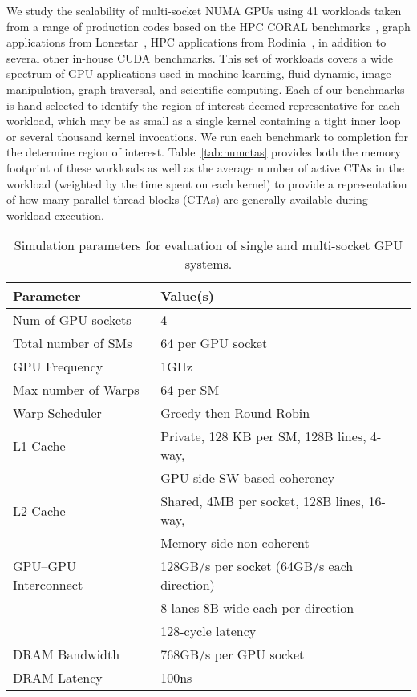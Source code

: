 We study the scalability of multi-socket NUMA GPUs using 41 workloads 
taken from a range of 
production codes based on the HPC CORAL benchmarks~\cite{coral}, graph 
applications from Lonestar~\cite{lonestar}, HPC applications from 
Rodinia~\cite{Che2009}, in addition to several other in-house CUDA benchmarks. 
This set of workloads covers a wide spectrum of GPU applications used in 
machine learning, fluid dynamic, image manipulation, graph traversal, and
scientific computing.  Each of our benchmarks is hand selected to identify
the region of interest deemed representative for each workload, which may
be as small as a single kernel containing a tight inner loop or several thousand
kernel invocations.  We run each benchmark to completion for the determine
region of interest. Table~\ref{tab:numctas} provides both the memory footprint
of these workloads as well as the average number of active CTAs in the workload
(weighted by the time spent on each kernel) to provide a representation of 
how many parallel thread blocks (CTAs) are generally available
during workload execution.

\begin{table}[tp]
\begin{small}
\centering
\begin{tabular}{ll}
\toprule
\textbf{Parameter} & \textbf{Value(s)} \\
\toprule
Num of GPU sockets & 4 \\
\midrule
Total number of SMs & 64 per GPU socket \\
\midrule
GPU Frequency & 1GHz \\
\midrule
Max number of Warps & 64 per SM \\
\midrule
Warp Scheduler & Greedy then Round Robin \\
\midrule
L1 Cache & Private, 128 KB per SM, 128B lines, 4-way, \\ 
& GPU-side SW-based coherency \\
\midrule
L2 Cache & Shared, 4MB per socket, 128B lines, 16-way, \\ 
& Memory-side non-coherent\\
\midrule
GPU--GPU Interconnect & 128GB/s per socket (64GB/s each direction) \\
& 8 lanes 8B wide each per direction \\
&128-cycle latency \\
\midrule
DRAM Bandwidth & 768GB/s per GPU socket\\
\midrule
DRAM Latency & 100ns \\
\toprule
\end{tabular}
\vspace{-.1in}
\caption{Simulation parameters for evaluation of single and multi-socket GPU 
systems.}
\vspace{-.2in}
\label{tab:setup}
\end{small}
\end{table} 


